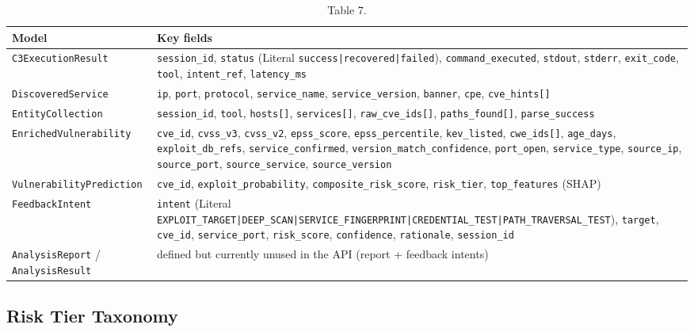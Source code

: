 \documentclass[10pt,journal,onecolumn]{IEEEtran}
\begin{document}
\begin{table}[h]
\caption{Table 7.}
\label{tab:t7}
\begin{tabularx}{\columnwidth}{l >{\raggedright\arraybackslash}X}
\toprule
\textbf{Model} & \textbf{Key fields}\\
\midrule
\texttt{C3ExecutionResult} & \texttt{session\_id}, \texttt{status} (Literal \texttt{success|recovered|failed}), \texttt{command\_executed}, \texttt{stdout}, \texttt{stderr}, \texttt{exit\_code}, \texttt{tool}, \texttt{intent\_ref}, \texttt{latency\_ms}\\
\texttt{DiscoveredService} & \texttt{ip}, \texttt{port}, \texttt{protocol}, \texttt{service\_name}, \texttt{service\_version}, \texttt{banner}, \texttt{cpe}, \texttt{cve\_hints[]}\\
\texttt{EntityCollection} & \texttt{session\_id}, \texttt{tool}, \texttt{hosts[]}, \texttt{services[]}, \texttt{raw\_cve\_ids[]}, \texttt{paths\_found[]}, \texttt{parse\_success}\\
\texttt{EnrichedVulnerability} & \texttt{cve\_id}, \texttt{cvss\_v3}, \texttt{cvss\_v2}, \texttt{epss\_score}, \texttt{epss\_percentile}, \texttt{kev\_listed}, \texttt{cwe\_ids[]}, \texttt{age\_days}, \texttt{exploit\_db\_refs}, \texttt{service\_confirmed}, \texttt{version\_\allowbreak match\_\allowbreak confidence}, \texttt{port\_open}, \texttt{service\_type}, \texttt{source\_ip}, \texttt{source\_port}, \texttt{source\_service}, \texttt{source\_version}\\
\texttt{VulnerabilityPrediction} & \texttt{cve\_id}, \texttt{exploit\_probability}, \texttt{composite\_risk\_score}, \texttt{risk\_tier}, \texttt{top\_features} (SHAP)\\
\texttt{FeedbackIntent} & \texttt{intent} (Literal \texttt{EXPLOIT\_\allowbreak TARGET|DEEP\_\allowbreak SCAN|SERVICE\_\allowbreak FINGERPRINT|CREDENTIAL\_\allowbreak TEST|PATH\_\allowbreak TRAVERSAL\_\allowbreak TEST}), \texttt{target}, \texttt{cve\_id}, \texttt{service\_port}, \texttt{risk\_score}, \texttt{confidence}, \texttt{rationale}, \texttt{session\_id}\\
\texttt{AnalysisReport} / \texttt{AnalysisResult} & defined but currently unused in the API (report + feedback intents)\\
\bottomrule
\end{tabularx}
\end{table}

\subsection{Risk Tier Taxonomy}
\end{document}
